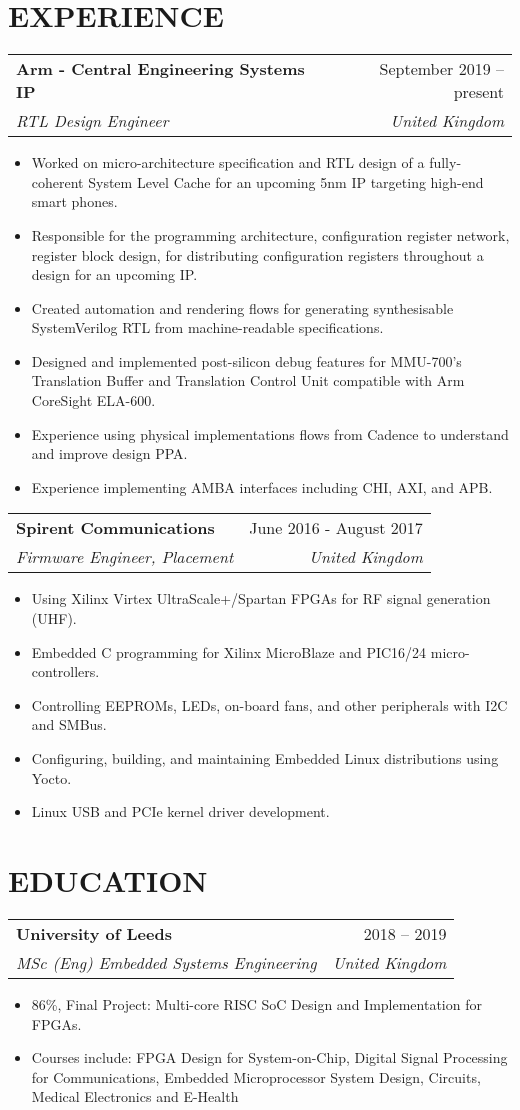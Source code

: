 \documentclass[letterpaper,11pt]{article}
\makeatletter
\newcommand{\resumeItem}[1]{
  \item\small{
    {#1 \vspace{-5pt}}
  }
}
\newcommand{\resumeSubheading}[4]{
  \vspace{-1pt}
    \begin{tabular*}{\textwidth}{l@{\extracolsep{\fill}}r}
      \textbf{#1} & #2 \\
      \textit{#3} & \textit{#4} \\
    \end{tabular*}\vspace{-3pt}
}
\newcommand{\resumeItemListStart}{\begin{itemize}}
\newcommand{\resumeItemListEnd}{\end{itemize}\vspace{-5pt}}
\makeatother
\begin{document}
\section{EXPERIENCE}
    \resumeSubheading{Arm - Central Engineering Systems IP}{September 2019 -- present}{RTL Design Engineer}{United Kingdom}
    \resumeItemListStart
        \resumeItem{Worked on micro-architecture specification and RTL design of a fully-coherent System Level Cache for an upcoming 5nm IP targeting high-end smart phones.}
        \resumeItem{Responsible for the programming architecture, configuration register network, register block design, for distributing configuration registers throughout a design for an upcoming IP.}
        \resumeItem{Created automation and rendering flows for generating synthesisable SystemVerilog RTL from machine-readable specifications.}
        \resumeItem{Designed and implemented post-silicon debug features for MMU-700's Translation Buffer and Translation Control Unit compatible with Arm CoreSight ELA-600.}
        \resumeItem{Experience using physical implementations flows from Cadence to understand and improve design PPA.}
        \resumeItem{Experience implementing AMBA interfaces including CHI, AXI, and APB.}
    \resumeItemListEnd
    \vspace{15pt}
    \resumeSubheading{Spirent Communications}{June 2016 - August 2017}{Firmware Engineer, Placement}{United Kingdom}
    \resumeItemListStart
        \resumeItem{Using Xilinx Virtex UltraScale+/Spartan FPGAs for RF signal generation (UHF).}
        \resumeItem{Embedded C programming for Xilinx MicroBlaze and PIC16/24 micro-controllers.}
        \resumeItem{Controlling EEPROMs, LEDs, on-board fans, and other peripherals with I2C and SMBus.}
        \resumeItem{Configuring, building, and maintaining Embedded Linux distributions using Yocto.}
        \resumeItem{Linux USB and PCIe kernel driver development.}
    \resumeItemListEnd

\vspace{10pt}
\section{EDUCATION}
    \resumeSubheading{University of Leeds}{2018 -- 2019}{MSc (Eng) Embedded Systems Engineering}{United Kingdom}
    \resumeItemListStart
        \resumeItem{86\%, Final Project: Multi-core RISC SoC Design and Implementation for FPGAs.}
        \resumeItem{Courses include: FPGA Design for System-on-Chip, Digital Signal Processing for Communications, Embedded
Microprocessor System Design, Circuits, Medical Electronics and E-Health}
    \resumeItemListEnd
    
\end{document}

